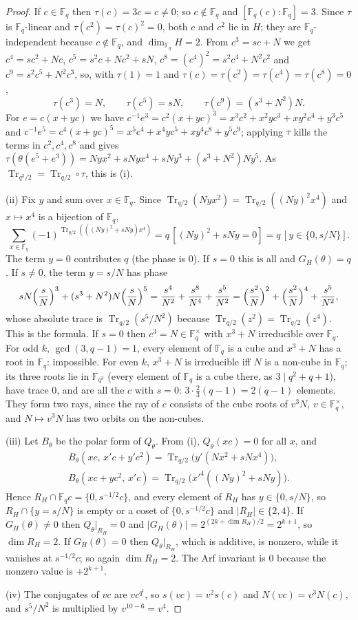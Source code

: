 \documentclass[12pt,a4paper]{amsart}
\theoremstyle{definition}
\newcommand{\F}{\mathbb{F}}
\newcommand{\Tr}{\operatorname{Tr}}
\begin{document}
\begin{proof}
If $c\in\F_q$ then $\tau(c)=3c=c\ne0$; so $c\notin\F_q$ and $[\F_q(c):\F_q]=3$. Since $\tau$ is $\F_q$-linear and $\tau(c^2)=\tau(c)^2=0$, both $c$ and $c^2$ lie in $H$; they are $\F_q$-independent because $c\notin\F_q$, and $\dim_{\F_q}H=2$. From $c^3=sc+N$ we get $c^4=sc^2+Nc$, $c^5=s^2c+Nc^2+sN$, $c^8=(c^4)^2=s^2c^4+N^2c^2$ and $c^9=s^2c^5+N^2c^3$, so, with $\tau(1)=1$ and $\tau(c)=\tau(c^2)=\tau(c^4)=\tau(c^8)=0$,
\[
\tau(c^3)=N,\qquad\tau(c^5)=sN,\qquad\tau(c^9)=(s^3+N^2)N .
\]
For $e=c(x+yc)$ we have $c^{-1}e^3=c^2(x+yc)^3=x^3c^2+x^2yc^3+xy^2c^4+y^3c^5$ and $c^{-1}e^5=c^4(x+yc)^5=x^5c^4+x^4yc^5+xy^4c^8+y^5c^9$; applying $\tau$ kills the terms in $c^2,c^4,c^8$ and gives $\tau(\theta(e^5+e^3))=Nyx^2+sNyx^4+sNy^3+(s^3+N^2)Ny^5$. As $\Tr_{q^3/2}=\Tr_{q/2}\circ\tau$, this is (i).

(ii) Fix $y$ and sum over $x\in\F_q$. Since $\Tr_{q/2}(Nyx^2)=\Tr_{q/2}((Ny)^2x^4)$ and $x\mapsto x^4$ is a bijection of $\F_q$,
\[
\sum_{x\in\F_q}(-1)^{\Tr_{q/2}(((Ny)^2+sNy)x^4)}=q\,[(Ny)^2+sNy=0]=q\,[y\in\{0,s/N\}] .
\]
The term $y=0$ contributes $q$ (the phase is $0$). If $s=0$ this is all and $G_H(\theta)=q$. If $s\ne0$, the term $y=s/N$ has phase
\[
sN\Bigl(\frac sN\Bigr)^3+(s^3+N^2)N\Bigl(\frac sN\Bigr)^5=\frac{s^4}{N^2}+\frac{s^8}{N^4}+\frac{s^5}{N^2}=\Bigl(\frac{s^2}N\Bigr)^2+\Bigl(\frac{s^2}N\Bigr)^4+\frac{s^5}{N^2},
\]
whose absolute trace is $\Tr_{q/2}(s^5/N^2)$ because $\Tr_{q/2}(z^2)=\Tr_{q/2}(z^4)$. This is the formula. If $s=0$ then $c^3=N\in\F_q^\times$ with $x^3+N$ irreducible over $\F_q$. For odd $k$, $\gcd(3,q-1)=1$, every element of $\F_q$ is a cube and $x^3+N$ has a root in $\F_q$: impossible. For even $k$, $x^3+N$ is irreducible iff $N$ is a non-cube in $\F_q$; its three roots lie in $\F_{q^3}$ (every element of $\F_q$ is a cube there, as $3\mid q^2+q+1$), have trace $0$, and are all the $c$ with $s=0$: $3\cdot\frac23(q-1)=2(q-1)$ elements. They form two rays, since the ray of $c$ consists of the cube roots of $v^3N$, $v\in\F_q^\times$, and $N\mapsto v^3N$ has two orbits on the non-cubes.

(iii) Let $B_\theta$ be the polar form of $Q_\theta$. From (i), $Q_\theta(xc)=0$ for all $x$, and
\begin{gather*}
B_\theta(xc,\,x'c+y'c^2)=\Tr_{q/2}\bigl(y'(Nx^2+sNx^4)\bigr),\\
B_\theta(xc+yc^2,\,x'c)=\Tr_{q/2}\bigl(x'^4((Ny)^2+sNy)\bigr).
\end{gather*}
Hence $R_H\cap\F_qc=\{0,s^{-1/2}c\}$, and every element of $R_H$ has $y\in\{0,s/N\}$, so $R_H\cap\{y=s/N\}$ is empty or a coset of $\{0,s^{-1/2}c\}$ and $|R_H|\in\{2,4\}$. If $G_H(\theta)\ne0$ then $Q_\theta|_{R_H}=0$ and $|G_H(\theta)|=2^{(2k+\dim R_H)/2}=2^{k+1}$, so $\dim R_H=2$. If $G_H(\theta)=0$ then $Q_\theta|_{R_H}$, which is additive, is nonzero, while it vanishes at $s^{-1/2}c$; so again $\dim R_H=2$. The Arf invariant is $0$ because the nonzero value is $+2^{k+1}$.

(iv) The conjugates of $vc$ are $vc^{q^i}$, so $s(vc)=v^2s(c)$ and $N(vc)=v^3N(c)$, and $s^5/N^2$ is multiplied by $v^{10-6}=v^4$.
\end{proof}
\end{document}
